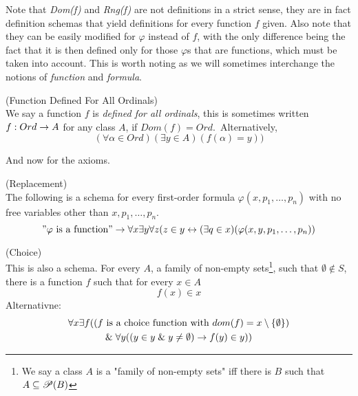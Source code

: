 Note that \emph{Dom(f)} and \emph{Rng(f)} are not definitions in a strict sense, they are in fact definition schemas that yield definitions for every function $f$ given. Also note that they can be easily modified for $\varphi$ instead of $f$, with the only difference being the fact that it is then defined only for those $\varphi$s that are functions, which must be taken into account. This is worth noting as we will sometimes interchange the notions of \emph{function} and \emph{formula}.

\begin{definition}{(Function Defined For All Ordinals)}\label{def:function_dfao}\\
We say a function $f$ is \emph{defined for all ordinals}, this is sometimes written $f: Ord \rightarrow A$ for any class $A$, if $Dom(f) = Ord$.\
Alternatively,
\begin{equation}
(\forall \alpha \in Ord)(\exists y \in A)(f(\alpha) = y))
\end{equation}
\end{definition}

And now for the axioms.

\begin{definition}{(Replacement)}\label{def:replacement}\\
The following is a schema for every first-order formula $\varphi(x, p_1, \ldots, p_n)$ with no free variables other than $x, p_1, \ldots, p_n$.
\begin{equation}
"\varphi\mbox{ is a function}"\rightarrow \forall x \exists y \forall z (z \in y \leftrightarrow (\exists q \in x)(\varphi(x, y, p_1, \ldots, p_n))
\end{equation}
\end{definition}


\begin{definition}{(Choice)}\label{def:choice}\\
This is also a schema. For every $A$, a family of non-empty sets\footnote{We say a class $A$ is a "family of non-empty sets" iff there is $B$ such that $A \subseteq \mathscr{P} (B)$}, such that $\emptyset \not\in S$, there is a function $f$ such that for every $x \in A$
\begin{equation}
f(x) \in x
\end{equation}
Alternativne: %
\begin{equation}
\begin{gathered}
\forall x \exists f ((f \mbox{ is a choice function with } dom(f) = x \setminus \{\emptyset\})\\
\mathrel{\&} \forall y ((y \in y \mathrel{\&} y \neq \emptyset) \rightarrow f(y) \in y))
\end{gathered}
\end{equation}
\end{definition}

